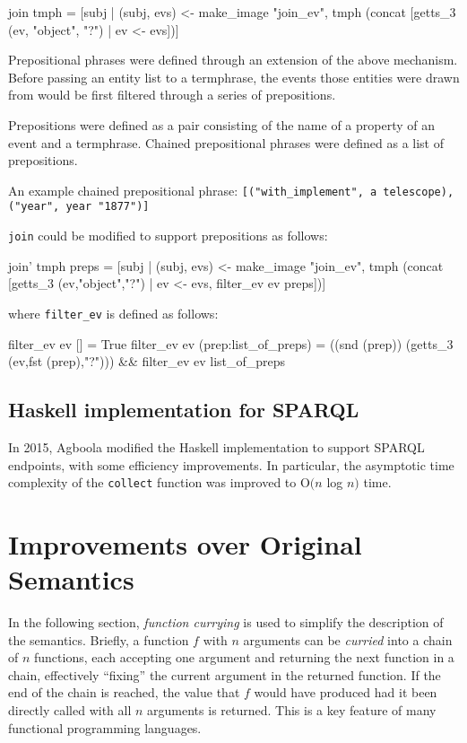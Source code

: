 \documentclass[../main.tex]{subfiles}
\begin{document}
\begin{code}
  join tmph = [subj | (subj, evs) <- make_image "join_ev",
       tmph (concat [getts_3 (ev,  "object", "?") | ev <- evs])]
\end{code}

Prepositional phrases were defined through an extension of the above
mechanism.  Before passing an entity list to a termphrase, the events
those entities were drawn from would be first filtered through a series
of prepositions.

Prepositions were defined as a pair consisting of the name of a property
of an event and a termphrase.  Chained prepositional phrases were defined
as a list of prepositions.

An example chained prepositional phrase: \texttt{[("with\_implement", a
telescope), ("year", year "1877")]}

\texttt{join} could be modified to support prepositions as follows:

\begin{code}
  join’ tmph preps = [subj | (subj, evs) <- make_image "join_ev", 
    tmph (concat [getts_3 (ev,"object","?") | ev <- evs,
      filter_ev ev preps])]
\end{code}

where \texttt{filter\_ev} is defined as follows\cite{frost2014denotational}:

\begin{code}
  filter_ev ev [] = True
  filter_ev ev (prep:list_of_preps)
    = ((snd (prep)) (getts_3 (ev,fst (prep),"?")))
        && filter_ev ev list_of_preps
\end{code}

\subsection{Haskell implementation for SPARQL}

In 2015, Agboola modified the Haskell implementation to support SPARQL endpoints, with some efficiency improvements\cite{agboola2015extensible}.  In particular, the asymptotic time complexity of the \texttt{collect} function was improved to O$(n$ log $n)$ time.

\section{Improvements over Original Semantics}

In the following section, {\em function currying}\cite{currying} is used to simplify the description of the semantics.
Briefly, a function $f$ with $n$ arguments can be {\em curried} into a chain of $n$ functions, each accepting one argument and returning the next function
in a chain, effectively ``fixing'' the current argument in the returned function.  If the end of the chain is reached, the value that $f$
would have produced had it been directly called with all $n$ arguments is returned.  This is a key feature of many functional programming languages\cite{haskell}.
\end{document}
